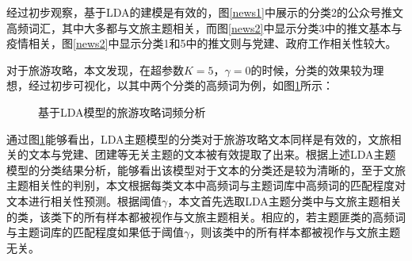 \documentclass[bwprint]{gmcmthesis}
\begin{document}
经过初步观察，基于LDA的建模是有效的，图\ref{news1}中展示的分类2的公众号推文高频词汇，其中大多都与文旅主题相关，而图\ref{news2}中显示分类3中的推文基本与疫情相关，图\ref{news2}中显示分类1和5中的推文则与党建、政府工作相关性较大。

对于旅游攻略，本文发现，在超参数$K=5$，$\gamma=0$的时候，分类的效果较为理想，经过初步可视化，以其中两个分类的高频词为例，如图\ref{travel_cipin}所示：

\begin{figure}[H]
    \centering
    \hspace{0in}
    \caption{基于LDA模型的旅游攻略词频分析}
    \label{travel_cipin}
\end{figure}

通过图\ref{travel_cipin}能够看出，LDA主题模型的分类对于旅游攻略文本同样是有效的，文旅相关的文本与党建、团建等无关主题的文本被有效提取了出来。根据上述LDA主题模型的分类结果分析，能够看出该模型对于文本的分类还是较为清晰的，至于文旅主题相关性的判别，本文根据每类文本中高频词与主题词库中高频词的匹配程度对文本进行相关性预测。根据阈值$\gamma$，本文首先选取LDA主题分类中与文旅主题相关的类，该类下的所有样本都被视作与文旅主题相关。相应的，若主题匪类的高频词与主题词库的匹配程度如果低于阈值$\gamma$，则该类中的所有样本都被视作与文旅主题无关。
\end{document}
